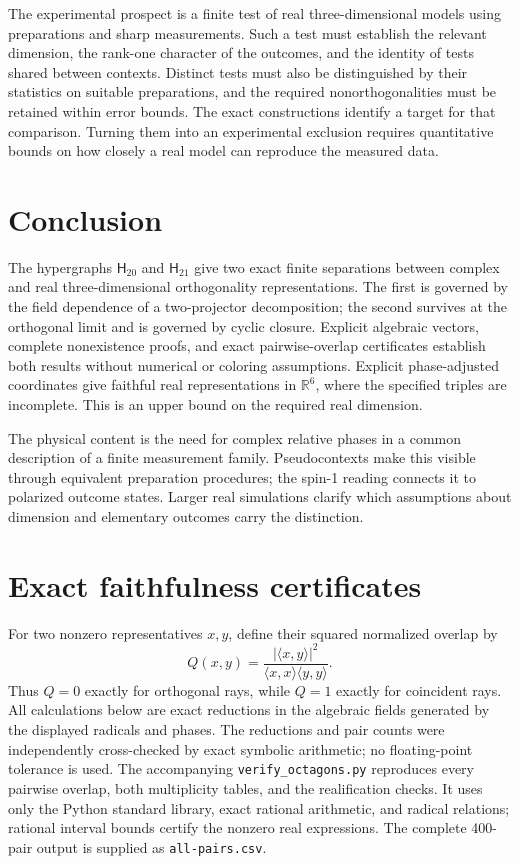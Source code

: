 \documentclass[twocolumn,aps,pra,floatfix,amsmath,amssymb,longbibliography]{revtex4-2}
\theoremstyle{definition}
\theoremstyle{remark}
\newcommand{\R}{\mathbb R}
\newcommand{\Htwenty}{\mathsf H_{20}}
\newcommand{\Htwentyone}{\mathsf H_{21}}
\begin{document}
The experimental prospect is a finite test of real three-dimensional
models using preparations and sharp measurements.  Such a test must
establish the relevant dimension, the rank-one character of the outcomes,
and the identity of tests shared between contexts.  Distinct tests must
also be distinguished by their statistics on suitable preparations, and
the required nonorthogonalities must be retained within error bounds.
The exact constructions identify a target for that comparison.  Turning
them into an experimental exclusion requires quantitative bounds on how
closely a real model can reproduce the measured data.

\section{Conclusion}

The hypergraphs $\Htwenty$ and $\Htwentyone$ give two exact finite
separations between complex and real three-dimensional orthogonality
representations.  The first is governed by the field dependence of a
two-projector decomposition; the second survives at the orthogonal limit
and is governed by cyclic closure.  Explicit algebraic vectors,
complete nonexistence proofs, and exact pairwise-overlap certificates
establish both results without numerical or coloring assumptions.  Explicit
phase-adjusted coordinates give faithful real representations in $\R^6$,
where the specified triples are incomplete.  This is an upper bound on
the required real dimension.


The physical content is the need for complex relative phases in a common
description of a finite measurement family.  Pseudocontexts make this
visible through equivalent preparation procedures; the spin-1 reading
connects it to polarized outcome states.  Larger real simulations clarify
which assumptions about dimension and elementary outcomes carry the
distinction.

\appendix

\section{Exact faithfulness certificates}
\label{app:faithfulness}

For two nonzero representatives $x,y$, define their squared normalized
overlap by
\begin{equation}
 Q(x,y)=\frac{|\langle x,y\rangle|^2}
 {\langle x,x\rangle\langle y,y\rangle}.
 \label{eq:Q}
\end{equation}
Thus $Q=0$ exactly for orthogonal rays, while $Q=1$ exactly for
coincident rays.  All calculations below are exact reductions in the
algebraic fields generated by the displayed radicals and phases.  The
reductions and pair counts were independently cross-checked by exact symbolic
arithmetic; no floating-point tolerance is used.
The accompanying \texttt{verify\_octagons.py} reproduces every pairwise
overlap, both multiplicity tables, and the realification checks.  It uses
only the Python standard library, exact rational arithmetic, and radical
relations; rational interval bounds certify the nonzero real expressions.
The complete 400-pair output is supplied as \texttt{all-pairs.csv}.
\end{document}
